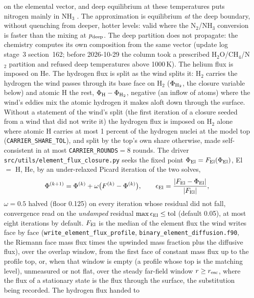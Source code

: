 on the elemental vector, and deep equilibrium at these temperatures puts
nitrogen mainly in NH$_3$ \citep[Sect.~3.1]{Moses2011}. The approximation is
equilibrium \emph{at} the deep boundary, without quenching from deeper,
hotter levels: valid where the N$_2$/NH$_3$ conversion is faster than the
mixing at $p_{\rm deep}$. The deep partition does not propagate: the
chemistry computes its own composition from the same vector (update log
stage~3 section~162; before 2026-10-29 the column took a prescribed
H$_2$O/CH$_4$/N$_2$ partition and refused deep temperatures above
1000\,K). The helium flux is imposed on He. The
hydrogen flux is split as the wind splits it: H$_2$ carries the hydrogen the
wind passes through its base face on H$_2$ ($\Phi_{\rm H_2}$, the closure
variable below) and atomic H the rest, $\Phi_{\rm H}-\Phi_{\rm H_2}$,
negative (an inflow of atoms) where the wind's eddies mix the atomic
hydrogen it makes aloft down through the surface. Without a statement of the
wind's split (the first iteration of a closure seeded from a wind that did
not write it) the hydrogen flux is imposed on H$_2$ alone where atomic H
carries at most 1 percent of the hydrogen nuclei at the model top
(\texttt{CARRIER\_SHARE\_TOL}), and split by the top's own share otherwise,
made self-consistent in at most \texttt{CARRIER\_ROUNDS}$=8$ rounds. The driver
\texttt{src/utils/element\_flux\_closure.py} seeks the fixed point
$\Phi_{\rm El} = F_{\rm El}(\Phi_{\rm El})$, El $=$ H, He, by an
under-relaxed Picard iteration of the two solves,
\begin{equation}
\Phi^{(k+1)} = \Phi^{(k)} + \omega\bigl(F^{(k)}-\Phi^{(k)}\bigr),
\qquad
\epsilon_{\rm El} = \frac{|F_{\rm El}-\Phi_{\rm El}|}{|F_{\rm El}|},
\label{eq:mol:closure}
\end{equation}
$\omega = 0.5$ halved (floor 0.125) on every iteration whose residual did not
fall, convergence read on the \emph{undamped} residual
$\max\epsilon_{\rm El}\le{\rm tol}$ (default 0.05), at most eight
iterations by default. $F_{\rm El}$ is the median of the element flux the wind writes
face by face (\texttt{write\_element\_flux\_profile},
\texttt{binary\_element\_diffusion.f90}, the Riemann face mass flux times the
upwinded mass fraction plus the diffusive flux), over the overlap window,
from the first face of constant mass flux up to the profile top, or, when
that window is empty (a profile whose top is the matching level), unmeasured
or not flat, over the steady far-field window
$r\ge r_{\rm esc}$, where the flux of a stationary state is the flux through
the surface, the substitution being recorded. The hydrogen flux handed to
